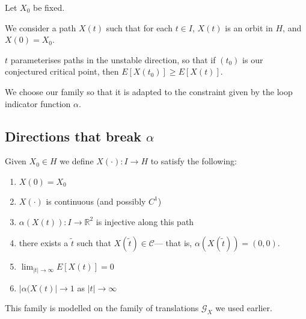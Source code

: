 \documentclass[12pt, a4paper]{amsart}
\theoremstyle{remark}
\newcommand{\R}{\mathbb{R}}
\newcommand{\So}{\mathbb{S}^1}
\begin{document}


Let $X_0$ be fixed. %

We consider a path $X(t)$  such that for each $t\in I$, $X(t)$ is an orbit in $H$, and $X(0)=X_0$.

$t$ parameterises paths in the unstable direction, so that if $(t_0)$ is  our conjectured critical point, then $E[X(t_0)]\ge E[X(t)]$.  


We choose our family so that it is  adapted to the constraint given by the loop indicator function $\alpha$. 

\subsection*{Directions that break $\alpha$}    Given $X_0\in H$ we define $X(\cdot):I\to H$ to satisfy the following:
\begin{enumerate}[label=(\roman*)]
\item $X(0)=X_0$ \label{condition i}
\item $X(\cdot)$ is continuous (and possibly $C^1$)
\item   $\alpha(X(t)):I\rightarrow\R^2$ is injective along this path%
\label{condition ii}
\item there exists a $\tilde{t}$ such that $X(\tilde{t})\in\mathcal{C}$--- that is, $\alpha(X(\tilde{t}))=(0,0)$.
\label{condition iii}
\item $\lim_{|t|\rightarrow\infty} E[X(t)]=0$
\item  $|\alpha(X(t)|\rightarrow 1$ as $|t|\rightarrow\infty$ %
 \label{condition iv}
\end{enumerate}

This family is modelled on the family of translations $\mathcal{G}_X$ we used earlier.  
\end{document}
